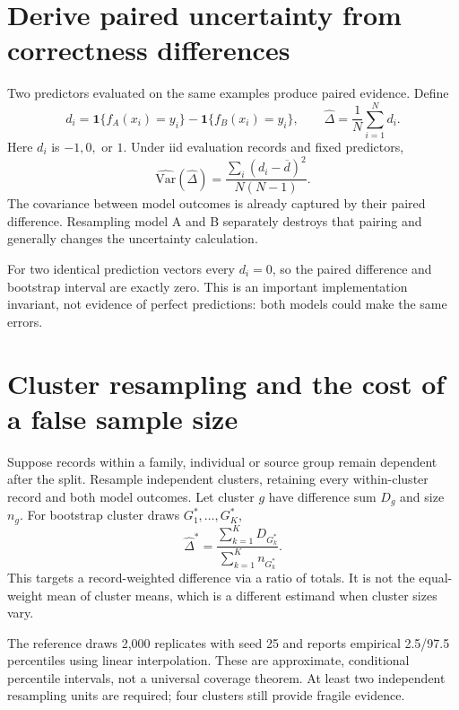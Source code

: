\section{Derive paired uncertainty from correctness differences}
Two predictors evaluated on the same examples produce paired evidence.
Define
\begin{equation}
d_i=\mathbf1\{f_A(x_i)=y_i\}-\mathbf1\{f_B(x_i)=y_i\},
\qquad \widehat\Delta=\frac1N\sum_{i=1}^N d_i.
\label{evod25:paired}
\end{equation}
Here $d_i$ is $-1,0,$ or $1$. Under iid evaluation records and fixed predictors,
\[
\widehat{\mathrm{Var}}(\widehat\Delta)
=\frac{\sum_i(d_i-\overline d)^2}{N(N-1)}.
\]
The covariance between model outcomes is already captured by their paired
difference. Resampling model A and B separately destroys that pairing and
generally changes the uncertainty calculation.

For two identical prediction vectors every $d_i=0$, so the paired difference
and bootstrap interval are exactly zero. This is an important implementation
invariant, not evidence of perfect predictions: both models could make the
same errors.


\section{Cluster resampling and the cost of a false sample size}
Suppose records within a family, individual or source group remain dependent
after the split. Resample independent clusters, retaining every within-cluster
record and both model outcomes. Let cluster $g$ have difference sum $D_g$
and size $n_g$. For bootstrap cluster draws $G_1^*,\ldots,G_K^*$,
\begin{equation}
\widehat\Delta^*=
\frac{\sum_{k=1}^{K}D_{G_k^*}}{\sum_{k=1}^{K}n_{G_k^*}}.
\label{evod25:cluster}
\end{equation}
This targets a record-weighted difference via a ratio of totals.
It is not the equal-weight mean of cluster means, which is a different
estimand when cluster sizes vary.


The reference draws 2,000 replicates with seed 25 and reports empirical
2.5/97.5 percentiles using linear interpolation. These are approximate,
conditional percentile intervals, not a universal coverage theorem.
At least two independent resampling units are required; four clusters
still provide fragile evidence.

